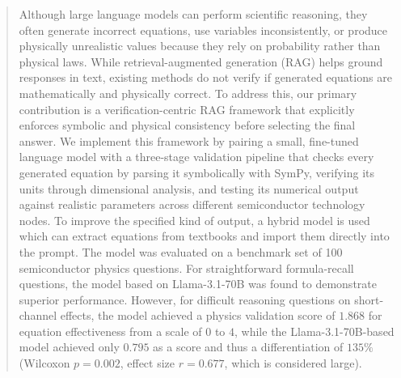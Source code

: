 \documentclass[a4paper,fleqn]{cas-sc}
\begin{document}



\begin{abstract}
Although large language models can perform scientific reasoning, they often generate
incorrect equations, use variables inconsistently, or produce physically unrealistic values
because they rely on probability rather than physical laws. While retrieval-augmented
generation (RAG) helps ground responses in text, existing methods do not verify if generated
equations are mathematically and physically correct. To address this, our primary
contribution is a verification-centric RAG framework that explicitly enforces symbolic
and physical consistency before selecting the final answer. We implement this framework by
pairing a small, fine-tuned language model with a three-stage validation pipeline that
checks every generated equation by parsing it symbolically with SymPy, verifying its units
through dimensional analysis, and testing its numerical output against realistic parameters
across different semiconductor technology nodes. 
To improve the specified kind of output, a hybrid model is used which can extract equations from textbooks and import them directly into the prompt. The model was evaluated on a benchmark set of 100 semiconductor physics questions. For straightforward formula-recall questions, the model based on Llama-3.1-70B was found to demonstrate superior performance. However, for difficult reasoning questions on short-channel effects, the model achieved a physics validation score of $1.868$ for equation effectiveness from a scale of $0$ to $4$, while the Llama-3.1-70B-based model achieved only $0.795$ as a score and thus a differentiation of $135\%$ (Wilcoxon $p = 0.002$, effect size $r = 0.677$, which is considered large).
\end{abstract}
\end{document}
